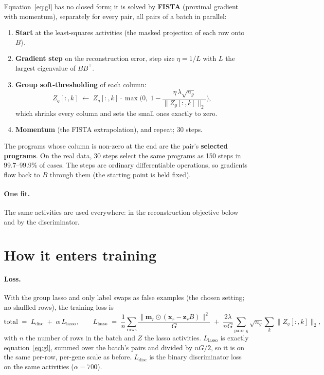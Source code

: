 \documentclass[11pt]{article}
\newcommand{\x}{\mathbf{x}}
\newcommand{\z}{\mathbf{z}}
\newcommand{\m}{\mathbf{m}}
\newcommand{\T}{^{\top}}
\begin{document}
Equation~\eqref{eq:gl} has no closed form; it is solved by
\textbf{FISTA} (proximal gradient with momentum), separately for every pair,
all pairs of a batch in parallel:
\begin{enumerate}
  \item \textbf{Start} at the least-squares activities (the masked projection of
  each row onto $B$).
  \item \textbf{Gradient step} on the reconstruction error, step size
  $\eta=1/L$ with $L$ the largest eigenvalue of $BB\T$.
  \item \textbf{Group soft-thresholding} of each column:
  \[
    Z_g[:,k]\;\leftarrow\;Z_g[:,k]\cdot\max\!\Big(0,\;1-\frac{\eta\,\lambda\sqrt{n_g}}{\|Z_g[:,k]\|_2}\Big),
  \]
  which shrinks every column and sets the small ones exactly to zero.
  \item \textbf{Momentum} (the FISTA extrapolation), and repeat; 30 steps.
\end{enumerate}
The programs whose column is non-zero at the end are the pair's \textbf{selected
programs}. On the real data, 30 steps select the same programs as 150 steps in
99.7--99.9\% of cases. The steps are ordinary differentiable operations, so
gradients flow back to $B$ through them (the starting point is held fixed).

\paragraph{One fit.} The same activities are used everywhere: in the
reconstruction objective below and by the discriminator.

\section{How it enters training}

\paragraph{Loss.} With the group lasso and only label swaps as false examples
(the chosen setting; no shuffled rows), the training loss is
\begin{equation}
  \text{total} \;=\; L_\text{disc} \;+\; \alpha\,L_\text{lasso},
  \qquad
  L_\text{lasso} \;=\; \frac1{n}\sum_{\text{rows}} \frac{\|\m_r\odot(\x_r-\z_r B)\|^2}{G}
  \;+\; \frac{2\lambda}{nG}\sum_{\text{pairs } g}\sqrt{n_g}\sum_k\|Z_g[:,k]\|_2 ,
\end{equation}
with $n$ the number of rows in the batch and $Z$ the lasso activities. $L_\text{lasso}$ is exactly equation~\eqref{eq:gl}, summed over the
batch's pairs and divided by $nG/2$, so it is on the same per-row, per-gene
scale as before. $L_\text{disc}$ is the binary discriminator loss on the same
activities ($\alpha=700$).
\end{document}
